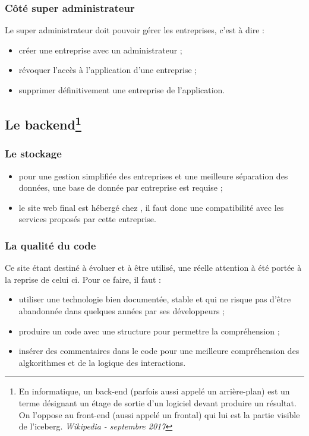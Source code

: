 \documentclass[a4paper, 11pt]{report}
\begin{document}
        \subsubsection{Côté super administrateur}
        Le super administrateur doit pouvoir gérer les entreprises, c'est à dire :
        \begin{itemize}
            \item créer une entreprise avec un administrateur ;
            \item révoquer l'accès à l'application d'une entreprise ;
            \item supprimer définitivement une entreprise de l'application.
        \end{itemize}
    \subsection[Le backend]{Le backend\footnote{En informatique, un back-end (parfois aussi appelé un arrière-plan) est un terme désignant un étage de sortie d'un logiciel devant produire un résultat. On l'oppose au front-end (aussi appelé un frontal) qui lui est la partie visible de l'iceberg. \textit{Wikipedia - septembre 2017}}}
        \subsubsection{Le stockage}
        \begin{itemize}
            \item pour une gestion simplifiée des entreprises et une meilleure séparation des données, une base de donnée par entreprise est requise ;
            \item  le site web final est hébergé chez \oswitch\cite{oswitch}, il faut donc une compatibilité avec les services proposés par cette entreprise.
        \end{itemize}

        \subsubsection{La qualité du code}
        Ce site étant destiné à évoluer et à être utilisé, une réelle attention à été portée à la reprise de celui ci. Pour ce faire, il faut :
        \begin{itemize}
            \item utiliser une technologie bien documentée, stable et qui ne risque pas d'être abandonnée dans quelques années par ses développeurs ;
            \item produire un code avec une structure pour permettre la compréhension ;
            \item insérer des commentaires dans le code pour une meilleure compréhension des algkorithmes et de la logique des interactions.
        \end{itemize}
\end{document}
